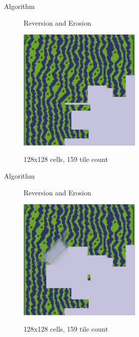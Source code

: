 \documentclass{beamer}
\begin{document}
  \begin{frame}[fragile]{Algorithm}

    \begin{figure}
      Reversion and Erosion

      \includegraphics[width=6cm]{img/fm_0035.pdf}

      128x128 cells, 159 tile count
    \end{figure}
  \end{frame}

  \begin{frame}[fragile]{Algorithm}

    \begin{figure}
      Reversion and Erosion

      \includegraphics[width=6cm]{img/fm_0036.pdf}

      128x128 cells, 159 tile count
    \end{figure}
  \end{frame}

%

\end{document}
